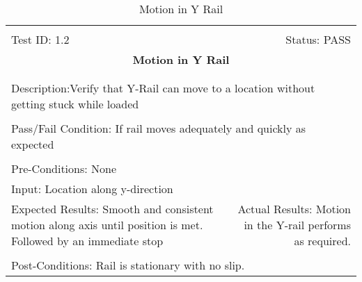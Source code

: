 \documentclass[titlepage]{article}
\begin{document}
\begin{center}
\begin{table}[h!]
\begin{tabular}{|l r|}\hline&\\[-2mm]
	Test ID: 1.2	&Status: PASS\\[-3mm]
	\multicolumn{2}{|c|}{\textbf{\large{Motion in Y Rail}}}\\&\\\hline&\\[-3mm]
	\multicolumn{2}{|p{\textwidth}|}{Description:Verify that Y-Rail can move to a location without getting stuck while loaded}\\[1mm]\hline&\\[-3mm]
	\multicolumn{2}{|p{\textwidth}|}{Pass/Fail Condition: If rail moves adequately and quickly as expected}\\[1mm]\hline&\\[-3mm]
	\multicolumn{2}{|p{\textwidth}|}{Pre-Conditions: None}\\[4mm]
	\multicolumn{2}{|p{\textwidth}|}{Input: Location along y-direction}\\[2mm]\hline
	\multicolumn{1}{|p{0.49\textwidth}}{Expected Results: Smooth and consistent motion along axis until position is met. Followed by an immediate stop}	&\multicolumn{1}{|p{0.45\textwidth}|}{Actual Results: Motion in the Y-rail performs as required.}\\\hline&\\[-3mm]
	\multicolumn{2}{|p{\textwidth}|}{Post-Conditions: Rail is stationary with no slip.}\\\hline
\end{tabular}
\caption{Motion in Y Rail}
\end{table}
\end{center}
\end{document}
